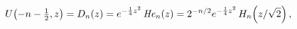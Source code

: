 \[\mathop{U\/}\nolimits\!\left(-n-\tfrac{1}{2},z\right)=\mathop{D_{n}\/}%
\nolimits\!\left(z\right)=e^{-\frac{1}{4}z^{2}}\mathop{\mathit{He}_{n}\/}%
\nolimits\!\left(z\right)=2^{-n/2}e^{-\frac{1}{4}z^{2}}\mathop{H_{n}\/}%
\nolimits\!\left(z/\sqrt{2}\right),\]